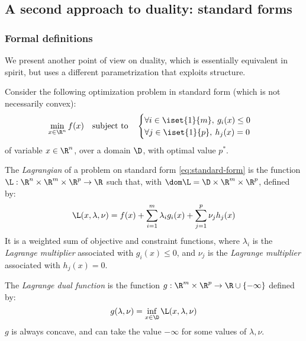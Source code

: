 \subsection{A second approach to duality: standard forms}
\subsubsection{Formal definitions}
\label{subsubsec:formal-definitions}
We present another point of view on duality, which is essentially equivalent in spirit, but uses a different parametrization that exploits structure.

Consider the following optimization problem in standard form (which is not necessarily convex):
\begin{equation}
    \label{eq:standard-form}
    \min_{x\in\R^n} f(x) \quad\text{subject to}\quad \begin{cases}
        \forall i\in\iset{1}{m}, \: g_i(x)\leq0\\
        \forall j\in\iset{1}{p}, \: h_j(x)=0
    \end{cases}
\end{equation}
of variable $x\in\R^n$, over a domain $\D$, with optimal value $p^*$.

\begin{definition}[Lagrangian]
    The \emph{Lagrangian} of a problem on standard form \eqref{eq:standard-form} is the function $\L:\R^n\times\R^m\times\R^p\to\R$ such that, with $\dom\L=\D\times\R^m\times\R^p$, defined by:
    \begin{equation}
        \L(x, \lambda, \nu) = f(x) + \sum_{i=1}^m\lambda_ig_i(x) + \sum_{j=1}^p\nu_jh_j(x)
    \end{equation}
    It is a weighted sum of objective and constraint functions, where $\lambda_i$ is the \emph{Lagrange multiplier} associated with $g_i(x)\leq0$, and $\nu_j$ is the \emph{Lagrange multiplier} associated with $h_j(x)=0$.
\end{definition}

\begin{definition}
    The \emph{Lagrange dual function} is the function $g:\R^m\times\R^p\to\R\cup\{-\infty\}$ defined by:
    \begin{equation}
        g(\lambda, \nu) = \inf_{x\in\D} \L(x, \lambda, \nu)
    \end{equation}
    $g$ is always concave, and can take the value $-\infty$ for some values of $\lambda, \nu$.
\end{definition}

